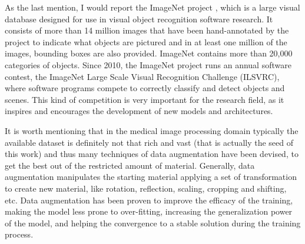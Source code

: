 As the last mention, I would report the ImageNet project \cite{5206848}, which is a large visual database designed for use in visual object recognition software research. It consists of more than 14 million images that have been hand-annotated by the project to indicate what objects are pictured and in at least one million of the images, bounding boxes are also provided. ImageNet contains more than 20,000 categories of objects. Since 2010, the ImageNet project runs an annual software contest, the ImageNet Large Scale Visual Recognition Challenge (ILSVRC), where software programs compete to correctly classify and detect objects and scenes. This kind of competition is very important for the research field, as it inspires and encourages the development of new models and architectures.

It is worth mentioning that in the medical image processing domain typically the available dataset is definitely not that rich and vast (that is actually the seed of this work) and thus many techniques of data augmentation have been devised, to get the best out of the restricted amount of material. Generally, data augmentation manipulates the starting material applying a set of transformation to create new material, like rotation, reflection, scaling, cropping and shifting, etc. Data augmentation has been proven to improve the efficacy of the training, making the model less prone to over-fitting, increasing the generalization power of the model, and helping the convergence to a stable solution during the training process.
